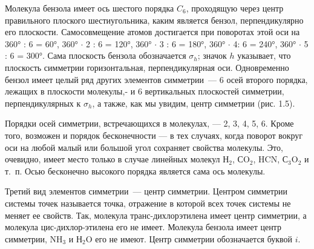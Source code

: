 Молекула бензола имеет ось шестого порядка $C_6$, проходящую через центр правильного 
плоского шестиугольника, каким является бензол, перпендикулярно его плоскости. 
Самосовмещение атомов достигается при поворотах этой оси на 360° : 6 = 60°, 360° $\cdot$ 2 : 6 = 120°, 360° $\cdot$ 3 : 6 = 180°, 360° $\cdot$ 4: 6 = 240°, 360° $\cdot$ 5 : 6 = 300°. Сама плоскость бензола обозначается $\sigma_h$; значок $h$ указывает, 
что плоскость симметрии горизонтальная, перпендикулярная оси. Одновременно бензол имеет целый ряд других 
элементов симметрии~--- 6 осей второго порядка, лежащих в плоскости молекулы,- и 6 вертикальных
 плоскостей симметрии, перпендикулярных к $\sigma_h$, а также, как мы увидим, центр симметрии (рис. 1.5).

Порядки осей симметрии, встречающихся в молекулах, --- 2, 3, 4, 5, 6. Кроме того, возможен и порядок бесконечности --- в тех случаях, когда поворот вокруг оси на любой малый или большой угол сохраняет свойства молекулы. Это, очевидно, имеет место только в случае линейных молекул Н$_2$, СO$_2$, HCN, С$_3$O$_2$ и т.~п. Осью бесконечно высокого порядка является сама ось молекулы.

Третий вид элементов симметрии~--- центр симметрии. Центром симметрии системы точек называется точка, отражение в которой всех точек системы не меняет ее свойств. Так, молекула транс-дихлорэтилена имеет центр симметрии, а молекула цис-дихлор-этилена его не имеет. Молекула бензола имеет центр симметрии, NH$_3$ и Н$_2$O его не имеют. Центр симметрии обозначается буквой $i$.


